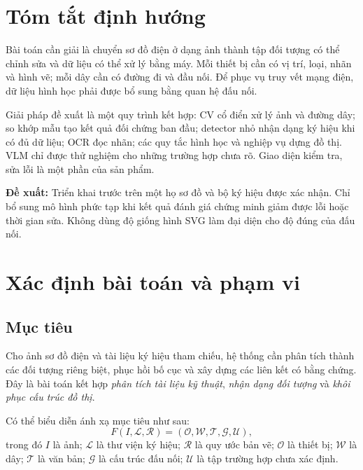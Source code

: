 \documentclass[11pt,a4paper]{article}
\newcommand{\decision}[1]{\par\smallskip\noindent\colorbox{Pale}{\parbox{\dimexpr\linewidth-2\fboxsep\relax}{\textbf{Đề xuất:} #1}}\par\smallskip}
\begin{document}
\section*{Tóm tắt định hướng}
Bài toán cần giải là chuyển sơ đồ điện ở dạng ảnh thành tập đối tượng có thể chỉnh sửa và dữ liệu có thể xử lý bằng máy. Mỗi thiết bị cần có vị trí, loại, nhãn và hình vẽ; mỗi dây cần có đường đi và đầu nối. Để phục vụ truy vết mạng điện, dữ liệu hình học phải được bổ sung bằng quan hệ đấu nối.

Giải pháp đề xuất là một quy trình kết hợp: CV cổ điển xử lý ảnh và đường dây; so khớp mẫu tạo kết quả đối chứng ban đầu; detector nhỏ nhận dạng ký hiệu khi có đủ dữ liệu; OCR đọc nhãn; các quy tắc hình học và nghiệp vụ dựng đồ thị. VLM chỉ được thử nghiệm cho những trường hợp chưa rõ. Giao diện kiểm tra, sửa lỗi là một phần của sản phẩm.

\decision{Triển khai trước trên một họ sơ đồ và bộ ký hiệu được xác nhận. Chỉ bổ sung mô hình phức tạp khi kết quả đánh giá chứng minh giảm được lỗi hoặc thời gian sửa. Không dùng độ giống hình SVG làm đại diện cho độ đúng của đấu nối.}

\begingroup
\small
\setlength{\parskip}{0pt}
\linespread{1}\selectfont
\tableofcontents
\endgroup
\clearpage
{}

\section{Xác định bài toán và phạm vi}
\subsection{Mục tiêu}
Cho ảnh sơ đồ điện và tài liệu ký hiệu tham chiếu, hệ thống cần phân tích thành các đối tượng riêng biệt, phục hồi bố cục và xây dựng các liên kết có bằng chứng. Đây là bài toán kết hợp \textit{phân tích tài liệu kỹ thuật}, \textit{nhận dạng đối tượng} và \textit{khôi phục cấu trúc đồ thị}.

Có thể biểu diễn ánh xạ mục tiêu như sau:
\begin{equation}
F(I,\mathcal{L},\mathcal{R})=(\mathcal{O},\mathcal{W},\mathcal{T},\mathcal{G},\mathcal{U}),
\end{equation}
trong đó $I$ là ảnh; $\mathcal{L}$ là thư viện ký hiệu; $\mathcal{R}$ là quy ước bản vẽ; $\mathcal{O}$ là thiết bị; $\mathcal{W}$ là dây; $\mathcal{T}$ là văn bản; $\mathcal{G}$ là cấu trúc đấu nối; $\mathcal{U}$ là tập trường hợp chưa xác định.
\end{document}
